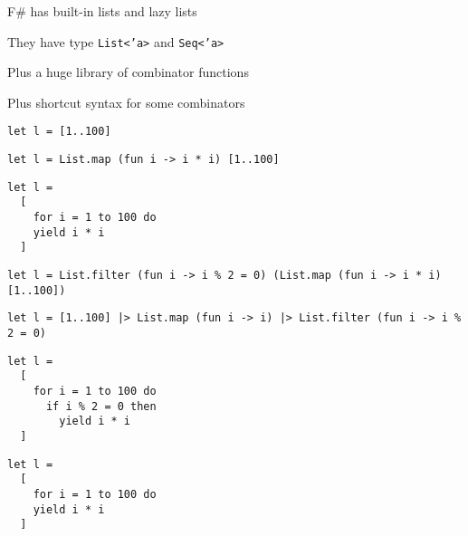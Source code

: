 \documentclass{beamer}
\begin{document}
\begin{slide}{
\item F\# has built-in lists and lazy lists
\item They have type \texttt{List<'a>} and \texttt{Seq<'a>}
\item Plus a huge library of combinator functions
\item Plus shortcut syntax for some combinators
}\end{slide}

\begin{frame}[fragile]
\begin{lstlisting}
let l = [1..100]
\end{lstlisting}
\end{frame}

\begin{frame}[fragile]
\begin{lstlisting}
let l = List.map (fun i -> i * i) [1..100]
\end{lstlisting}
\end{frame}

\begin{frame}[fragile]
\begin{lstlisting}
let l =
  [
    for i = 1 to 100 do 
    yield i * i
  ]
\end{lstlisting}
\end{frame}

\begin{frame}[fragile]
\begin{lstlisting}
let l = List.filter (fun i -> i % 2 = 0) (List.map (fun i -> i * i) [1..100])
\end{lstlisting}
\end{frame}

\begin{frame}[fragile]
\begin{lstlisting}
let l = [1..100] |> List.map (fun i -> i) |> List.filter (fun i -> i % 2 = 0)
\end{lstlisting}
\end{frame}

\begin{frame}[fragile]
\begin{lstlisting}
let l =
  [
    for i = 1 to 100 do 
      if i % 2 = 0 then
        yield i * i
  ]
\end{lstlisting}
\end{frame}

\begin{frame}[fragile]
\begin{lstlisting}
let l =
  [
    for i = 1 to 100 do 
    yield i * i
  ]
\end{lstlisting}
\end{frame}
\end{document}
